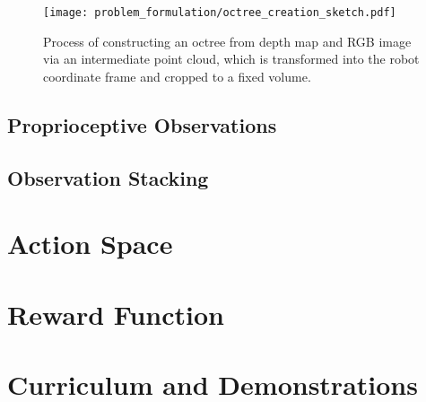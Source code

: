 \begin{figure}[ht]
    \centering
    \texttt{[image: problem\_formulation/octree\_creation\_sketch.pdf]}
    \caption{Process of constructing an octree from depth map and RGB image via an intermediate point cloud, which is transformed into the robot coordinate frame and cropped to a fixed volume.}
    \label{fig:problem_formulation_octree_creation_sketch}
\end{figure}




\subsection{Proprioceptive Observations}


\subsection{Observation Stacking}



\section{Action Space}



\section{Reward Function}



\section{Curriculum and Demonstrations}


